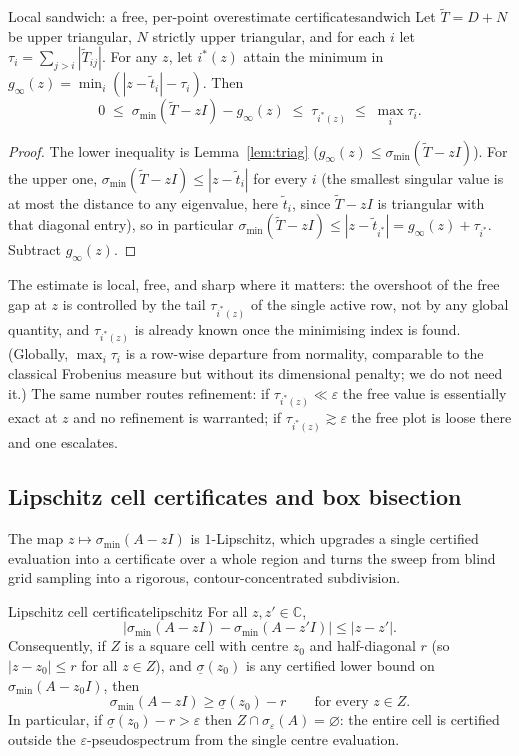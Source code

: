 \documentclass[11pt, a4paper]{article}
\numberwithin{equation}{section}
\newcommand{\abs}[1]{\left|#1\right|}
\newcommand{\tT}{\widetilde{T}}
\newcommand{\C}{\mathbb{C}}
\begin{document}
\begin{lemma}{Local sandwich: a free, per-point overestimate certificate}{sandwich}
  Let $\tT = D + N$ be upper triangular, $N$ strictly upper triangular, and for
  each $i$ let $\tau_i = \sum_{j>i}\abs{\tT_{ij}}$.  For any $z$, let $i^*(z)$
  attain the minimum in $g_\infty(z) = \min_i(\abs{z - \tilde t_i} - \tau_i)$.
  Then
  \[
    0 \;\le\; \sigma_{\min}(\tT - zI) - g_\infty(z) \;\le\; \tau_{i^*(z)}
      \;\le\; \max_i \tau_i.
  \]
\end{lemma}

\begin{proof}
The lower inequality is Lemma~\ref{lem:triag} ($g_\infty(z) \le
\sigma_{\min}(\tT - zI)$).  For the upper one, $\sigma_{\min}(\tT - zI) \le
\abs{z - \tilde t_{i}}$ for every $i$ (the smallest singular value is at most the
distance to any eigenvalue, here $\tilde t_i$, since $\tT - zI$ is triangular
with that diagonal entry), so in particular $\sigma_{\min}(\tT - zI) \le \abs{z
- \tilde t_{i^*}} = g_\infty(z) + \tau_{i^*}$.  Subtract $g_\infty(z)$.
\end{proof}

The estimate is local, free, and sharp where it matters: the overshoot of the
free gap at $z$ is controlled by the tail $\tau_{i^*(z)}$ of the single active
row, not by any global quantity, and $\tau_{i^*(z)}$ is already known once the
minimising index is found.  (Globally, $\max_i\tau_i$ is a row-wise departure
from normality, comparable to the classical Frobenius measure but without its
dimensional penalty; we do not need it.)  The same number routes refinement: if
$\tau_{i^*(z)} \ll \varepsilon$ the free value is essentially exact at $z$ and no
refinement is warranted; if $\tau_{i^*(z)} \gtrsim \varepsilon$ the free plot is
loose there and one escalates.

\subsection{Lipschitz cell certificates and box bisection}

The map $z \mapsto \sigma_{\min}(A - zI)$ is $1$-Lipschitz, which upgrades a
single certified evaluation into a certificate over a whole region and turns the
sweep from blind grid sampling into a rigorous, contour-concentrated
subdivision.

\begin{lemma}{Lipschitz cell certificate}{lipschitz}
  For all $z, z' \in \C$,
  \[
    \abs{\sigma_{\min}(A - zI) - \sigma_{\min}(A - z'I)} \le \abs{z - z'}.
  \]
  Consequently, if $Z$ is a square cell with centre $z_0$ and half-diagonal $r$
  \textup{(}so $\abs{z - z_0}\le r$ for all $z\in Z$\textup{)}, and
  $\underline{\sigma}(z_0)$ is any certified lower bound on $\sigma_{\min}(A -
  z_0 I)$, then
  \[
    \sigma_{\min}(A - zI) \ge \underline{\sigma}(z_0) - r
    \qquad\text{for every } z \in Z.
  \]
  In particular, if $\underline{\sigma}(z_0) - r > \varepsilon$ then $Z \cap
  \sigma_\varepsilon(A) = \varnothing$: the entire cell is certified outside the
  $\varepsilon$-pseudospectrum from the single centre evaluation.
\end{lemma}
\end{document}

